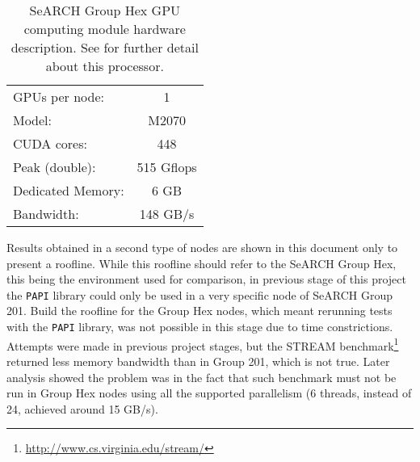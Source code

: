 \begin{table}[!htp]
	\begin{center}
		\begin{tabular}{lc}
			\hline
			GPUs per node: & 1	\\
			Model: & \tesla M2070\\
			CUDA cores: & 448	\\
			Peak (double): & 515 Gflops	\\
			\hline
			Dedicated Memory: & 6 GB	\\
			Bandwidth: & 148 GB/s\\
			\hline
		\end{tabular}
		\caption[SeARCH Group Hex GPU computing module hardware description]{SeARCH Group Hex GPU computing module hardware description. See \cite{teslaM2070} for further detail about this processor.}
		\label{tab:tesla:m2070}
	\end{center}
\end{table}

Results obtained in a second type of nodes are shown in this document only to present a roofline.
While this roofline should refer to the SeARCH Group Hex, this being the environment used for comparison, in previous stage of this project the \texttt{PAPI} library could only be used in a very specific node of SeARCH Group 201.
Build the roofline for the Group Hex nodes, which meant rerunning tests with the \texttt{PAPI} library, was not possible in this stage due to time constrictions.
Attempts were made in previous project stages, but the STREAM benchmark\footnote{\url{http://www.cs.virginia.edu/stream/}} returned less memory bandwidth than in Group 201, which is not true.
Later analysis showed the problem was in the fact that such benchmark must not be run in Group Hex nodes using all the supported parallelism (6 threads, instead of 24, achieved around 15 GB/s).